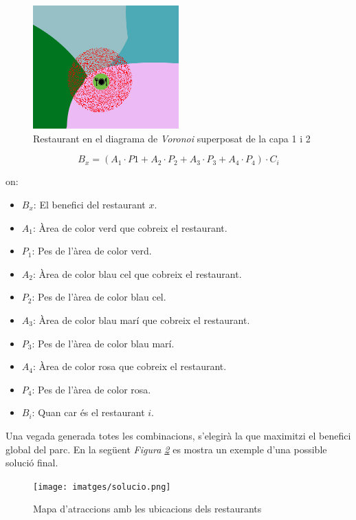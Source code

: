 \documentclass[12pt]{article}
\begin{document}
\begin{figure}[H]
	\centering
	\includegraphics[width=0.5\textwidth]{imatges/benefici_restaurant.png}
	\caption{Restaurant en el diagrama de \textit{Voronoi} superposat de la capa 1 i 2}
	\label{fig:benefici_restaurant}
\end{figure}

$$B_{x} = (A_{1} \cdot P{1} + A_{2} \cdot P_{2} + A_{3} \cdot P_{3} + A_{4} \cdot P_{4}) \cdot C_{i}$$

on:

\begin{itemize}
	\item $B_{x}$: El benefici del restaurant $x$.
	\item $A_{1}$: Àrea de color verd que cobreix el restaurant.
	\item $P_{1}$: Pes de l'àrea de color verd.
	\item $A_{2}$: Àrea de color blau cel que cobreix el restaurant.
	\item $P_{2}$: Pes de l'àrea de color blau cel.
	\item $A_{3}$: Àrea de color blau marí que cobreix el restaurant.
	\item $P_{3}$: Pes de l'àrea de color blau marí.
	\item $A_{4}$: Àrea de color rosa que cobreix el restaurant.
	\item $P_{4}$: Pes de l'àrea de color rosa.
	\item $B_{i}$: Quan car és el restaurant $i$.
\end{itemize}

Una vegada generada totes les combinacions, s'elegirà la que maximitzi el benefici global del parc. En la següent \textit{Figura \ref{fig:mapa_restaurants}} es mostra un exemple d'una possible solució final.

\begin{figure}[H]
	\centering
	\texttt{[image: imatges/solucio.png]}
	\caption{Mapa d'atraccions amb les ubicacions dels restaurants}
	\label{fig:mapa_restaurants}
\end{figure}
\end{document}
